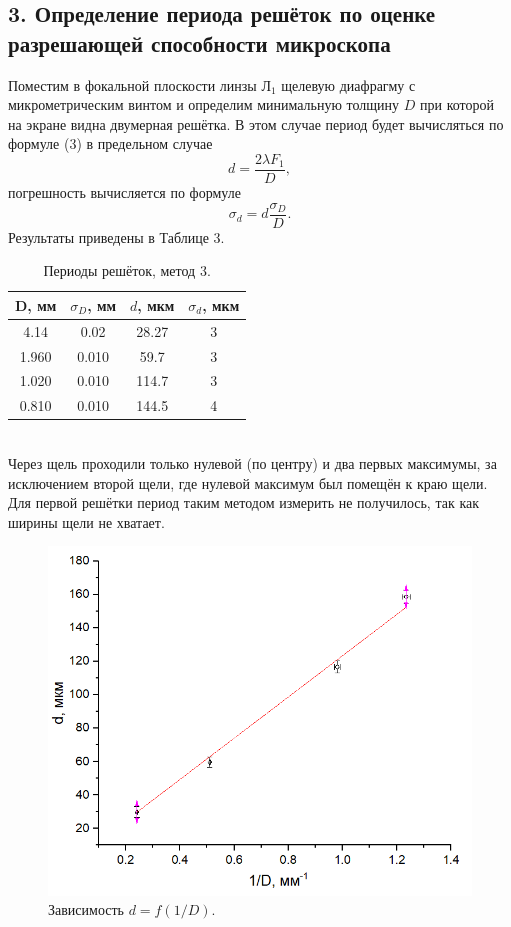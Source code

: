 \documentclass[a4paper,12pt]{article} %
\begin{document}
\subsection{3. Определение периода решёток по оценке разрешающей способности микроскопа}
Поместим в фокальной плоскости линзы $\text{Л}_1$ щелевую диафрагму с микрометрическим винтом и определим минимальную толщину $D$ при которой на экране видна двумерная решётка. В этом случае период будет вычисляться по формуле (3) в предельном случае
$$
d = \dfrac{2\lambda F_1}{D},
$$
погрешность вычисляется по формуле 
$$
\sigma_d = d \dfrac{\sigma_D}{D}.
$$
Результаты приведены в Таблице 3.
\begin{table}[h]
\begin{tabular}{|c|c|c|c|}
\hline
D, мм & $\sigma_D$, мм & $d$, мкм & $\sigma_d$, мкм \\ \hline
4.14  & 0.02           & 28.27    & 3            \\ \hline
1.960 & 0.010          & 59.7     & 3             \\ \hline
1.020 & 0.010          & 114.7    & 3             \\ \hline
0.810 & 0.010          & 144.5    & 4             \\ \hline
\end{tabular}
\centering
\caption{Периоды решёток, метод 3.}
\end{table}\\
Через щель проходили только нулевой (по центру) и два первых максимумы, за исключением второй щели, где нулевой максимум был помещён к краю щели. Для первой решётки период таким методом измерить не получилось, так как ширины щели не хватает.
\newpage
\begin{figure}[h]
\includegraphics[scale=0.7]{2.png}
\centering
\caption{Зависимость $d = f(1/D)$.}
\end{figure}
\end{document}
